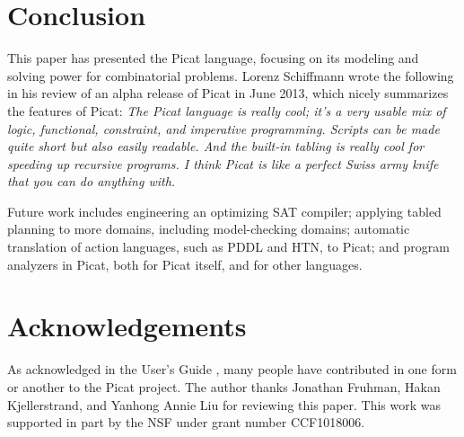 \documentclass{new_tlp}
\begin{document}
\section{Conclusion}
This paper has presented the Picat language, focusing on its modeling and solving power for combinatorial problems. Lorenz Schiffmann wrote the following in his review of an alpha release of Picat in June 2013, which nicely summarizes the features of Picat: {\it The Picat language is really cool; it's a very usable mix of logic, functional, constraint, and imperative programming. Scripts can be made quite short but also easily readable. And the built-in tabling is really cool for speeding up recursive programs. I think Picat is like a perfect Swiss army knife that you can do anything with.} 

Future work includes engineering an optimizing SAT compiler; applying tabled planning to more domains, including model-checking domains; automatic translation of action languages, such as PDDL and HTN, to Picat; and program analyzers in Picat, both for Picat itself, and for other languages.

\section*{Acknowledgements}
As acknowledged in the User's Guide \cite{PicatGuide}, many people have contributed in one form or another to the Picat project. The author thanks Jonathan Fruhman, Hakan Kjellerstrand, and Yanhong Annie Liu for reviewing this paper. This work was supported in part by the NSF under grant number CCF1018006.
\end{document}
